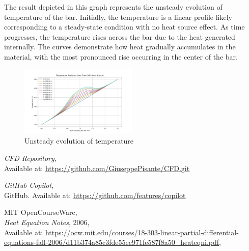 \documentclass{article}
\begin{document}
The result depicted in this graph represents the unsteady evolution of temperature of the bar. Initially, the temperature is a linear profile 
likely corresponding to a steady-state condition with no heat source effect. As time progresses, the temperature rises across the bar due to 
the heat generated internally. The curves demonstrate how heat gradually accumulates in the material, with the most pronounced rise occurring 
in the center of the bar.

\begin{figure}[H]
  \centering
  \includegraphics[width=0.5\textwidth]{Figure_3.png}
  \caption{Unsteady evolution of temperature}
  \label{fig: Unsteady evolution of temperature}
\end{figure}

\begin{thebibliography}{9}
  \textit{CFD Repository},\\
  Available at: \url{https://github.com/GiuseppePisante/CFD.git}
  
  \textit{GitHub Copilot},\\
  GitHub. Available at: \url{https://github.com/features/copilot}
  
  MIT OpenCourseWare,\\
  \textit{Heat Equation Notes}, 2006,\\
  Available at: \url{https://ocw.mit.edu/courses/18-303-linear-partial-differential-equations-fall-2006/d11b374a85c3fde55ec971fe587f8a50_heateqni.pdf},\\
\end{thebibliography}
\end{document}
